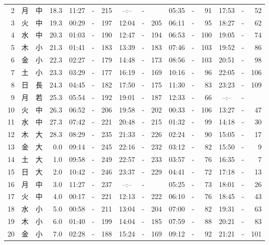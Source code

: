 \documentclass[12pt.a4j]{jsarticle}
\begin{document}
\begin{center}
\begin{table}[ht]
\begin{tabular}{|rc|cr|ccrccr|ccrccr|}
 2 & 月 & 中 & 18.3 &  11:27 &-& 215  &  --:-- &-&     &   05:35 &-&  91  &   17:53 &-&  52  \\
 3 & 火 & 中 & 19.3 &  00:29 &-& 197  &  12:04 &-& 205  &   06:11 &-&  95  &   18:27 &-&  62  \\
 4 & 水 & 中 & 20.3 &  01:03 &-& 190  &  12:47 &-& 194  &   06:53 &-& 100  &   19:05 &-&  74  \\
 5 & 木 & 小 & 21.3 &  01:41 &-& 183  &  13:39 &-& 183  &   07:46 &-& 103  &   19:52 &-&  86  \\
 6 & 金 & 小 & 22.3 &  02:27 &-& 179  &  14:48 &-& 173  &   08:56 &-& 103  &   20:51 &-&  98  \\
 7 & 土 & 小 & 23.3 &  03:29 &-& 177  &  16:19 &-& 169  &   10:16 &-&  96  &   22:05 &-& 106  \\
 8 & 日 & 長 & 24.3 &  04:45 &-& 182  &  17:50 &-& 175  &   11:30 &-&  83  &   23:23 &-& 109  \\
 9 & 月 & 若 & 25.3 &  05:54 &-& 192  &  19:01 &-& 187  &   12:33 &-&  66  &   --:-- &-&     \\
10 & 火 & 中 & 26.3 &  06:52 &-& 206  &  19:58 &-& 202  &   00:33 &-& 106  &   13:27 &-&  47  \\
11 & 水 & 中 & 27.3 &  07:42 &-& 221  &  20:48 &-& 215  &   01:32 &-&  99  &   14:18 &-&  30  \\
12 & 木 & 大 & 28.3 &  08:29 &-& 235  &  21:33 &-& 226  &   02:24 &-&  90  &   15:05 &-&  17  \\
13 & 金 & 大 &  0.0 &  09:14 &-& 245  &  22:16 &-& 232  &   03:12 &-&  82  &   15:50 &-&   9  \\
14 & 土 & 大 &  1.0 &  09:58 &-& 249  &  22:57 &-& 233  &   03:57 &-&  76  &   16:35 &-&   7  \\
15 & 日 & 大 &  2.0 &  10:42 &-& 246  &  23:37 &-& 229  &   04:41 &-&  72  &   17:18 &-&  13  \\
16 & 月 & 中 &  3.0 &  11:27 &-& 237  &  --:-- &-&     &   05:25 &-&  73  &   18:01 &-&  26  \\
17 & 火 & 中 &  4.0 &  00:17 &-& 221  &  12:13 &-& 222  &   06:10 &-&  76  &   18:45 &-&  43  \\
18 & 水 & 小 &  5.0 &  00:58 &-& 211  &  13:04 &-& 204  &   07:00 &-&  82  &   19:31 &-&  63  \\
19 & 木 & 小 &  6.0 &  01:40 &-& 199  &  14:04 &-& 185  &   07:59 &-&  88  &   20:21 &-&  83  \\
20 & 金 & 小 &  7.0 &  02:28 &-& 188  &  15:24 &-& 169  &   09:12 &-&  92  &   21:21 &-& 101  \\

\end{tabular}
\end{table}
\end{center}
\end{document}
